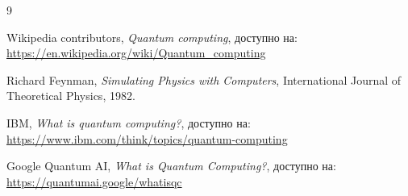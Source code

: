 \documentclass[12pt]{article}
\theoremstyle{plain}
\theoremstyle{definition}
\begin{document}
	\newpage
	
	\begin{thebibliography}{9}
		
		Wikipedia contributors, \textit{Quantum computing}, доступно на: \url{https://en.wikipedia.org/wiki/Quantum_computing}
		
		Richard Feynman, \textit{Simulating Physics with Computers}, International Journal of Theoretical Physics, 1982.
		
		IBM, \textit{What is quantum computing?}, доступно на: \url{https://www.ibm.com/think/topics/quantum-computing}
		
		Google Quantum AI, \textit{What is Quantum Computing?}, доступно на: \url{https://quantumai.google/whatisqc}
		
	\end{thebibliography} 
	
	
\end{document}

